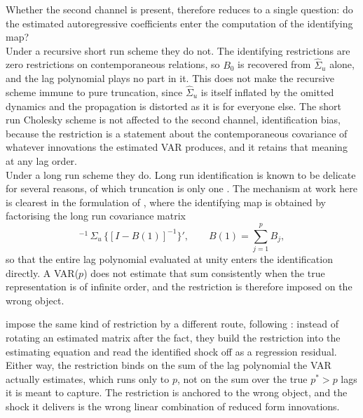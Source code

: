 \documentclass[12pt, a4paper]{article}
\begin{document}
Whether the second channel is present, therefore reduces to a single question: do the estimated autoregressive
coefficients enter the computation of the identifying map?
\\

Under a recursive short run scheme they do not. The identifying restrictions are zero restrictions
on contemporaneous relations, so $B_0$ is recovered from $\hat{\Sigma}_u$ alone, and the lag polynomial plays no part in it. This does not make the recursive
scheme immune to pure truncation, since $\hat{\Sigma}_u$ is itself inflated by the omitted dynamics and
the propagation is distorted as it is for everyone else. The short run Cholesky scheme is not affected to the second
channel, identification bias, because the restriction is a statement about the contemporaneous covariance of whatever
innovations the estimated VAR produces, and it retains that meaning at any lag order.
\\

Under a long run scheme they do. Long run identification is known to be delicate for several
reasons, of which truncation is only one \citep{Faust_Leeper1997, Erceg_Guerrieri_Gust2005,
ChariKehoeMcGrattan2008, CEV2007}. The mechanism at work here is clearest in the formulation of
\citet{BlanchardQuah1989}, where the identifying map is obtained by factorising the long run
covariance matrix
\begin{equation}
    [I - B(1)]^{-1}\,\Sigma_u\,\bigl\{[I - B(1)]^{-1}\bigr\}',
    \qquad B(1) = \sum_{j=1}^{p} B_j ,
    \label{eq:lr-map}
\end{equation}
so that the entire lag polynomial evaluated at unity enters the identification directly. A VAR($p$)
does not estimate that sum consistently when the true representation is of infinite order, and the
restriction is therefore imposed on the wrong object.

\citet{ACEL2011} impose the same kind of restriction by a different route, following
\citet{Fisher2006}: instead of rotating an estimated matrix after the fact, they build the
restriction into the estimating equation and read the identified shock off as a regression residual.
Either way, the restriction binds on the sum of
the lag polynomial the VAR actually estimates, which runs only to $p$, not on the sum over the true
$p^{*}>p$ lags it is meant to capture. The restriction is anchored to the wrong object, and the shock
it delivers is the wrong linear combination of reduced form innovations.
\\
\end{document}
